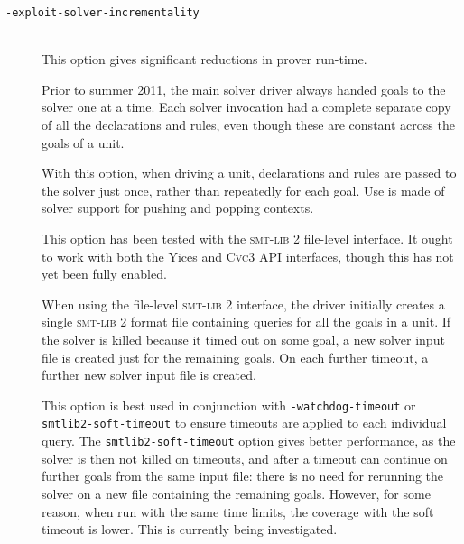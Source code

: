 \documentclass[12pt,fleqn]{article}
\newcommand{\cvcthree}{\textsc{Cvc}3}
\newcommand{\yices}{Yices}
\newcommand{\smtlib}{\textsc{smt-lib}}
\newcommand{\optionb}[1]{\item[\texttt{-{#1}}]\ \\}
\newcommand{\optionv}[2]{\item[\texttt{-{#1}=}\mdseries\textit{#2}]\ \\}
\begin{document}
\begin{description}
\optionb{exploit-solver-incrementality}
  This option gives significant reductions in prover run-time.

  Prior to summer 2011, the main solver driver always handed goals
  to the solver one at a time.  Each solver invocation had a complete
  separate copy of all the declarations and rules, even though these
  are constant across the goals of a unit. 

  With this option, when driving a unit, declarations and rules are
  passed to the solver just once, rather than repeatedly for each
  goal.  Use is made of solver support for pushing and popping
  contexts.

  This option has been tested with the \smtlib{} 2 file-level
  interface.  It ought to work with both the \yices{} and \cvcthree{}
  API interfaces, though this has not yet been fully enabled.

  When using the file-level \smtlib{} 2 interface, the driver
  initially creates a single \smtlib{} 2 format file containing
  queries for all the goals in a unit.  If the solver is killed
  because it timed out on some goal, a new solver input file is
  created just for the remaining goals. On each further timeout, a
  further new solver input file is created.

  This option is best used in conjunction with
  \texttt{-watchdog-timeout} or \texttt{smtlib2-soft-timeout} to
  ensure timeouts are applied to each individual query.  The
  \texttt{smtlib2-soft-timeout} option gives better performance, as
  the solver is then not killed on timeouts, and after a timeout can
  continue on further goals from the same input file: there is no need
  for rerunning the solver on a new file containing the remaining
  goals. However, for some reason, when run with the same time limits,
  the coverage with the soft timeout is lower.  This is currently being
  investigated.
  




\end{description}
\end{document}
